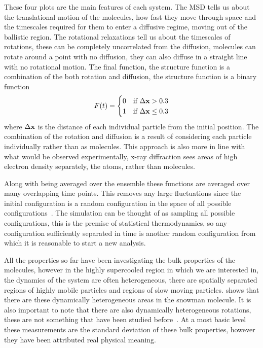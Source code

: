These four plots are the main features of each system. The MSD tells us about the translational motion of the molecules, how fast they move through space and the timescales required for them to enter a diffusive regime, moving out of the ballistic region. The rotational relaxations tell us about the timescales of rotations, these can be completely uncorrelated from the diffusion, molecules can rotate around a point with no diffusion, they can also diffuse in a straight line with no rotational motion. The final function, the structure function is a combination of the both rotation and diffusion, the structure function is a binary function
\begin{align}
    F(t) = \begin{cases}
        0 &\text{if } \Delta \mathbf{x} > 0.3 \\
        1 &\text{if } \Delta \mathbf{x} \leq 0.3
    \end{cases}
\end{align}
where $\Delta \mathbf{x}$ is the distance of each individual particle from the initial position. The combination of the rotation and diffusion is a result of considering each particle individually rather than as molecules. This approach is also more in line with what would be observed experimentally, x-ray diffraction sees areas of high electron density separately, the atoms, rather than molecules.

Along with being averaged over the ensemble these functions are averaged over many overlapping time points. This removes any large fluctuations since the initial configuration is a random configuration in the space of all possible configurations~\tocite. The simulation can be thought of as sampling all possible configurations, this is the premise of statistical thermodynamics, so any configuration sufficiently separated in time is another random configuration from which it is reasonable to start a new analysis.

All the properties so far have been investigating the bulk properties of the molecules, however in the highly supercooled region in which we are interested in, the dynamics of the system are often heterogeneous, there are spatially separated regions of highly mobile particles and regions of slow moving particles. \textfigref{} shows that there are these dynamically heterogeneous areas in the snowman molecule. It is also important to note that there are also dynamically heterogeneous rotations, these are not something that have been studied before~\tocheck. At a most basic level these measurements are the standard deviation of these bulk properties, however they have been attributed real physical meaning.

